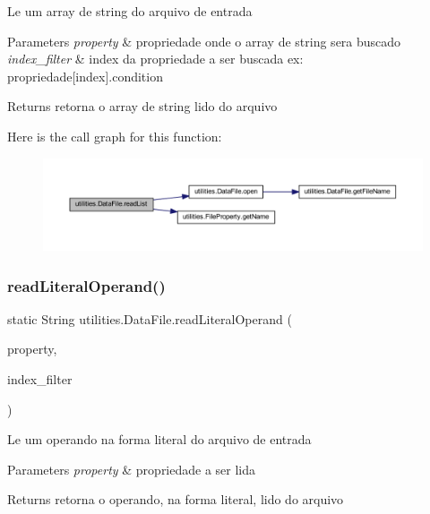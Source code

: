 Le um array de string do arquivo de entrada 
\begin{DoxyParams}{Parameters}
{\em property} & propriedade onde o array de string sera buscado \\
\hline
{\em index\+\_\+filter} & index da propriedade a ser buscada ex\+: propriedade\mbox{[}index\mbox{]}.condition \\
\hline
\end{DoxyParams}
\begin{DoxyReturn}{Returns}
retorna o array de string lido do arquivo 
\end{DoxyReturn}
Here is the call graph for this function\+:\nopagebreak
\begin{figure}[H]
\begin{center}
\leavevmode
\includegraphics[width=350pt]{classutilities_1_1_data_file_a86acc1699af206a96ab51c94d6663afe_cgraph}
\end{center}
\end{figure}
\mbox{\label{classutilities_1_1_data_file_adb4c1c9272d3497615385f4f8278ab60}} 
\subsubsection{\texorpdfstring{read\+Literal\+Operand()}{readLiteralOperand()}}
{\footnotesize\ttfamily static String utilities.\+Data\+File.\+read\+Literal\+Operand (\begin{DoxyParamCaption}\item[{\hyperlink{enumutilities_1_1_file_property}{File\+Property}}]{property,  }\item[{int}]{index\+\_\+filter }\end{DoxyParamCaption})\hspace{0.3cm}{\ttfamily [static]}}

Le um operando na forma literal do arquivo de entrada


\begin{DoxyParams}{Parameters}
{\em property} & propriedade a ser lida \\
\hline
\end{DoxyParams}
\begin{DoxyReturn}{Returns}
retorna o operando, na forma literal, lido do arquivo 
\end{DoxyReturn}

